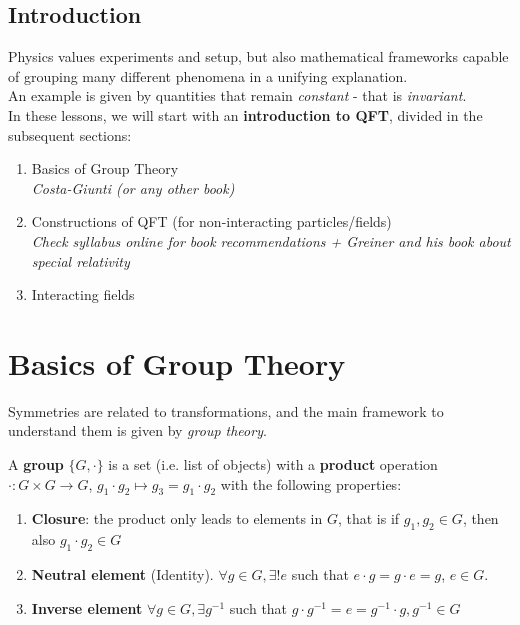 \documentclass[../Theoretical.tex]{subfiles}
\begin{document}
\section{Introduction}
Physics values experiments and setup, but also mathematical frameworks capable of grouping many different phenomena in a unifying explanation.\\
An example is given by quantities that remain \textit{constant} - that is \textit{invariant}.\\

In these lessons, we will start with an \textbf{introduction to QFT}, divided in the subsequent sections:
\begin{enumerate}
\item Basics of Group Theory\\
\textit{Costa-Giunti  (or any other book)}
\item Constructions of QFT (for non-interacting particles/fields)\\
\textit{Check syllabus online for book recommendations + Greiner  and his book about special relativity}
\item Interacting fields
\end{enumerate}

\chapter{Basics of Group Theory}
Symmetries are related to transformations, and the main framework to understand them is given by \textit{group theory}.

\begin{dfn}
\label{dfn:group}
A \textbf{group} $\{G, \cdot\}$ is a set (i.e. list of objects) with a \textbf{product} operation $\cdot\colon G \times G \to G$, $g_1 \cdot g_2 \mapsto g_3 = g_1 \cdot g_2$ with the following properties:
\begin{enumerate}
\item \textbf{Closure}: the product only leads to elements in $G$, that is if $g_1, g_2 \in G$, then also $g_1 \cdot g_2 \in G$
\item \textbf{Neutral element} (Identity). $\forall g \in G, \exists! e$ such that $e\cdot g= g\cdot e=g$, $e\in G$.
\item \textbf{Inverse element} $\forall g \in G, \exists g^{-1}$ such that $g\cdot g^{-1} = e = g^{-1}\cdot g, g^{-1}\in G$
\end{enumerate}
\end{dfn}
\end{document}

